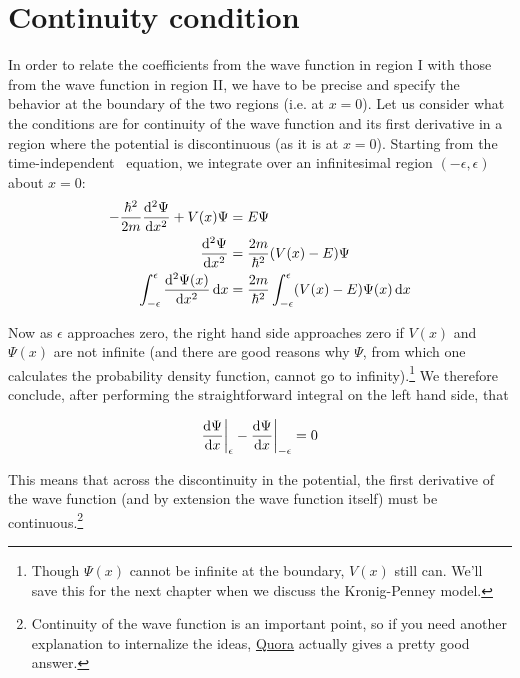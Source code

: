 \section{Continuity condition}
In order to relate the coefficients from the wave function in region I with those from the wave function in region II, we have to be precise and specify the behavior at the boundary of the two regions (i.e. at $x=0$). Let us consider what the conditions are for continuity of the wave function and its first derivative in a region where the potential is discontinuous (as it is at $x=0$). Starting from the time-independent \Sch\ equation, we integrate over an infinitesimal region $(-\epsilon, \epsilon)$ about $x=0$:
\begin{align*}
	-\frac{\hbar^2}{2m} \dv[2]{\Psi}{x} + V(x)\Psi &= E\Psi \\
	\dv[2]{\Psi}{x} &= \frac{2m}{\hbar^2}(V(x) - E)\Psi \\
	\int_{-\epsilon}^{\epsilon} \dv[2]{\Psi(x)}{x} \dd{x} &= \frac{2m}{\hbar^2} \int_{-\epsilon}^{\epsilon} (V(x)-E)\Psi(x) \dd{x} 
\end{align*}

Now as $\epsilon$ approaches zero, the right hand side approaches zero if $V(x)$ and $\Psi(x)$ are not infinite (and there are good reasons why $\Psi$, from which one calculates the probability density function, cannot go to infinity).\footnote{Though $\Psi(x)$ cannot be infinite at the boundary, $V(x)$ still can. We'll save this for the next chapter when we discuss the Kronig-Penney model.} We therefore conclude, after performing the straightforward integral on the left hand side, that
\begin{tcolorbox}[title = Continuity of the wave function] \vspace{-2ex}
	\begin{equation}
		\dv{\Psi}{x} \bigg|_{\epsilon} - \dv{\Psi}{x} \bigg|_{-\epsilon} = 0 \label{eq:cont-dx}
	\end{equation}
\end{tcolorbox}

This means that across the discontinuity in the potential, the first derivative of the wave function (and by extension the wave function itself) must be continuous.\footnote{Continuity of the wave function is an important point, so if you need another explanation to internalize the ideas, \href{https://www.quora.com/Why-does-the-wave-function-have-to-be-continuous}{Quora} actually gives a pretty good answer.} 


